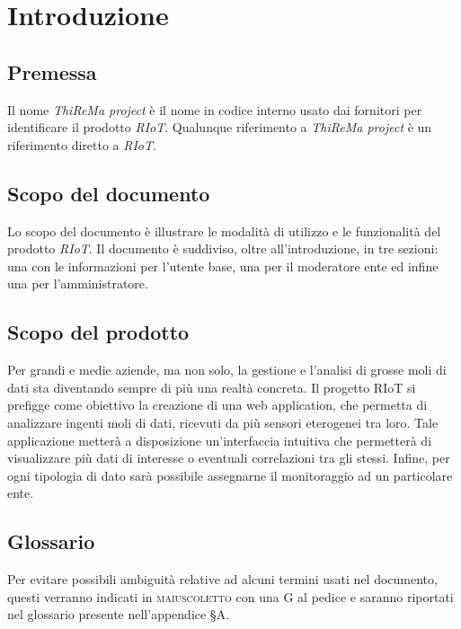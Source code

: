 \section{Introduzione}
	\subsection{Premessa}
		Il nome \textit{ThiReMa project} è il nome in codice interno usato dai fornitori per identificare il prodotto \textit{RIoT}. Qualunque riferimento a \textit{ThiReMa project} è un riferimento diretto a \textit{RIoT}. 
	\subsection{Scopo del documento}
		Lo scopo del documento è illustrare le modalità di utilizzo e le funzionalità del prodotto \textit{RIoT}. Il documento è suddiviso, oltre all'introduzione, in tre sezioni: una con le informazioni per l'utente base, una per il moderatore ente ed infine una per l'amministratore.	
	\subsection{Scopo del prodotto}
		Per grandi e medie aziende, ma non solo, la gestione e l'analisi di grosse moli di dati sta diventando sempre di più una realtà concreta.
	 	\newline
		Il progetto RIoT si prefigge come obiettivo la creazione di una web application, che permetta di analizzare ingenti moli di dati, ricevuti da più sensori eterogenei tra loro. Tale applicazione metterà a disposizione un'interfaccia intuitiva che permetterà di visualizzare più dati di interesse o eventuali correlazioni tra gli stessi. Infine, per ogni tipologia di dato sarà possibile assegnarne il monitoraggio ad un particolare ente.	
	\subsection{Glossario}
		Per evitare possibili ambiguità relative ad alcuni termini usati nel documento, questi verranno indicati in \textsc{maiuscoletto} con una G al pedice e saranno riportati nel glossario presente nell'appendice \S A.
